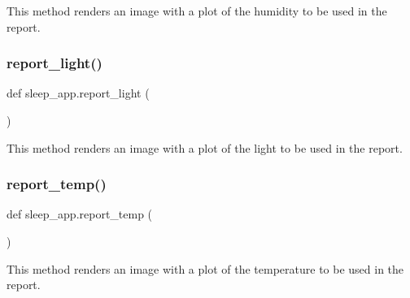 This method renders an image with a plot of the humidity to be used in the report. 

\mbox{\label{namespacesleep__app_a723dcf6e683d8f98fa39a98758284dd0}} 
\subsubsection{\texorpdfstring{report\+\_\+light()}{report\_light()}}
{\footnotesize\ttfamily def sleep\+\_\+app.\+report\+\_\+light (\begin{DoxyParamCaption}{ }\end{DoxyParamCaption})}



This method renders an image with a plot of the light to be used in the report. 

\mbox{\label{namespacesleep__app_a6f717173c23196c59198e2a8bd49f5d0}} 
\subsubsection{\texorpdfstring{report\+\_\+temp()}{report\_temp()}}
{\footnotesize\ttfamily def sleep\+\_\+app.\+report\+\_\+temp (\begin{DoxyParamCaption}{ }\end{DoxyParamCaption})}



This method renders an image with a plot of the temperature to be used in the report. 


